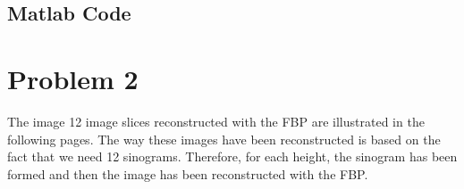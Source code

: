 \documentclass{article}
\begin{document}
\newpage
\subsection{Matlab Code}




\newpage

\section{Problem 2}
The image 12 image slices reconstructed with the FBP are illustrated in the following pages. The way these images have been reconstructed is based on the fact that we need 12 sinograms. Therefore, for each height, the sinogram has been formed and then the image has been reconstructed with the FBP.
\end{document}
